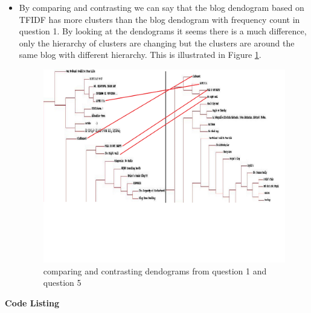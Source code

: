 \begin{itemize}
\item By comparing and contrasting we can say that the blog dendogram based on TFIDF has more clusters than the blog dendogram with frequency count in question 1. By looking at the dendograms it seems there is a much difference, only the hierarchy of clusters are changing but the clusters are around the same blog with different hierarchy. This is illustrated in Figure \ref{fig:q5fig2}.
\begin{figure}[h!]
\begin{center}
\includegraphics[scale=0.55, keepaspectratio=true]{figures/combined.png}
\caption{comparing and contrasting dendograms from question 1 and question 5}
\label{fig:q5fig2}
\end{center}
\end{figure}
\end{itemize}


\newpage
\textbf{Code Listing}
\sloppy



